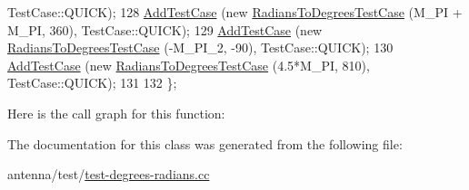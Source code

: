 \begin{DoxyCode}
      TestCase::QUICK);
128   \hyperlink{classns3_1_1TestCase_a3718088e3eefd5d6454569d2e0ddd835}{AddTestCase} (\textcolor{keyword}{new} \hyperlink{classRadiansToDegreesTestCase}{RadiansToDegreesTestCase} (M\_PI + M\_PI, 360), 
      TestCase::QUICK);
129   \hyperlink{classns3_1_1TestCase_a3718088e3eefd5d6454569d2e0ddd835}{AddTestCase} (\textcolor{keyword}{new} \hyperlink{classRadiansToDegreesTestCase}{RadiansToDegreesTestCase} (-M\_PI\_2, -90), 
      TestCase::QUICK);
130   \hyperlink{classns3_1_1TestCase_a3718088e3eefd5d6454569d2e0ddd835}{AddTestCase} (\textcolor{keyword}{new} \hyperlink{classRadiansToDegreesTestCase}{RadiansToDegreesTestCase} (4.5*M\_PI, 810), 
      TestCase::QUICK);
131 
132 \};
\end{DoxyCode}


Here is the call graph for this function\+:




The documentation for this class was generated from the following file\+:\begin{DoxyCompactItemize}
\item 
antenna/test/\hyperlink{test-degrees-radians_8cc}{test-\/degrees-\/radians.\+cc}\end{DoxyCompactItemize}
